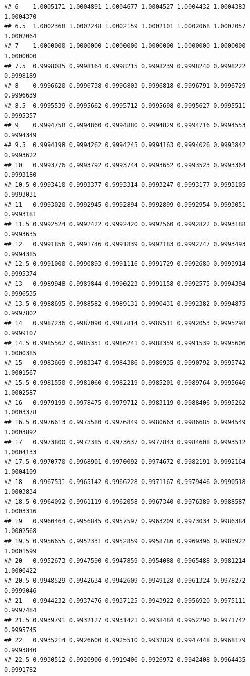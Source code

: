 \documentclass[
]{book}
\begin{document}
\begin{verbatim}
## 6    1.0005171 1.0004891 1.0004677 1.0004527 1.0004432 1.0004383 1.0004370
## 6.5  1.0002368 1.0002248 1.0002159 1.0002101 1.0002068 1.0002057 1.0002064
## 7    1.0000000 1.0000000 1.0000000 1.0000000 1.0000000 1.0000000 1.0000000
## 7.5  0.9998085 0.9998164 0.9998215 0.9998239 0.9998240 0.9998222 0.9998189
## 8    0.9996620 0.9996738 0.9996803 0.9996818 0.9996791 0.9996729 0.9996639
## 8.5  0.9995539 0.9995662 0.9995712 0.9995698 0.9995627 0.9995511 0.9995357
## 9    0.9994758 0.9994860 0.9994880 0.9994829 0.9994716 0.9994553 0.9994349
## 9.5  0.9994198 0.9994262 0.9994245 0.9994163 0.9994026 0.9993842 0.9993622
## 10   0.9993776 0.9993792 0.9993744 0.9993652 0.9993523 0.9993364 0.9993180
## 10.5 0.9993410 0.9993377 0.9993314 0.9993247 0.9993177 0.9993105 0.9993031
## 11   0.9993020 0.9992945 0.9992894 0.9992899 0.9992954 0.9993051 0.9993181
## 11.5 0.9992524 0.9992422 0.9992420 0.9992560 0.9992822 0.9993188 0.9993635
## 12   0.9991856 0.9991746 0.9991839 0.9992183 0.9992747 0.9993493 0.9994385
## 12.5 0.9991000 0.9990893 0.9991116 0.9991729 0.9992680 0.9993914 0.9995374
## 13   0.9989948 0.9989844 0.9990223 0.9991158 0.9992575 0.9994394 0.9996535
## 13.5 0.9988695 0.9988582 0.9989131 0.9990431 0.9992382 0.9994875 0.9997802
## 14   0.9987236 0.9987090 0.9987814 0.9989511 0.9992053 0.9995298 0.9999107
## 14.5 0.9985562 0.9985351 0.9986241 0.9988359 0.9991539 0.9995606 1.0000385
## 15   0.9983669 0.9983347 0.9984386 0.9986935 0.9990792 0.9995742 1.0001567
## 15.5 0.9981550 0.9981060 0.9982219 0.9985201 0.9989764 0.9995646 1.0002587
## 16   0.9979199 0.9978475 0.9979712 0.9983119 0.9988406 0.9995262 1.0003378
## 16.5 0.9976613 0.9975580 0.9976849 0.9980663 0.9986685 0.9994549 1.0003892
## 17   0.9973800 0.9972385 0.9973637 0.9977843 0.9984608 0.9993512 1.0004133
## 17.5 0.9970770 0.9968901 0.9970092 0.9974672 0.9982191 0.9992164 1.0004109
## 18   0.9967531 0.9965142 0.9966228 0.9971167 0.9979446 0.9990518 1.0003834
## 18.5 0.9964092 0.9961119 0.9962058 0.9967340 0.9976389 0.9988587 1.0003316
## 19   0.9960464 0.9956845 0.9957597 0.9963209 0.9973034 0.9986384 1.0002568
## 19.5 0.9956655 0.9952331 0.9952859 0.9958786 0.9969396 0.9983922 1.0001599
## 20   0.9952673 0.9947590 0.9947859 0.9954088 0.9965488 0.9981214 1.0000422
## 20.5 0.9948529 0.9942634 0.9942609 0.9949128 0.9961324 0.9978272 0.9999046
## 21   0.9944232 0.9937476 0.9937125 0.9943922 0.9956920 0.9975111 0.9997484
## 21.5 0.9939791 0.9932127 0.9931421 0.9938484 0.9952290 0.9971742 0.9995745
## 22   0.9935214 0.9926600 0.9925510 0.9932829 0.9947448 0.9968179 0.9993840
## 22.5 0.9930512 0.9920906 0.9919406 0.9926972 0.9942408 0.9964435 0.9991782

\end{verbatim}
\end{document}
